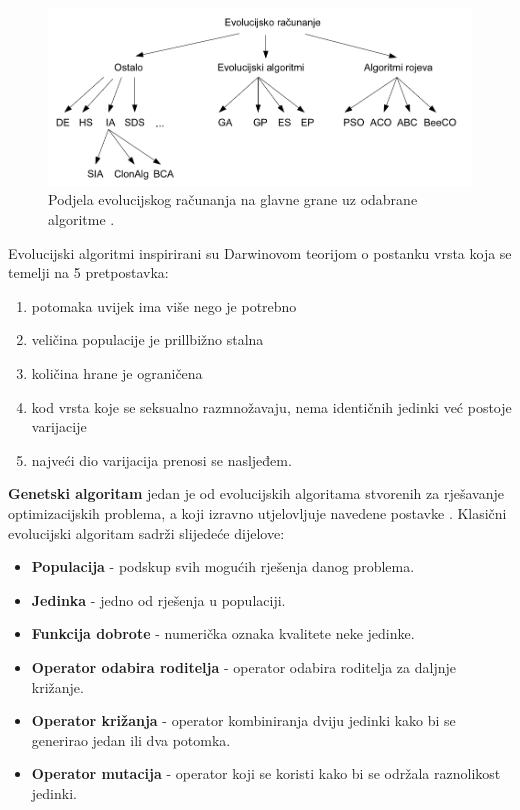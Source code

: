 \documentclass[times, utf8, zavrsni]{fer}
\begin{document}
\begin{figure}[htb]
\centering
\includegraphics[width=15cm]{images/evolucijske_grane.png}
\caption{Podjela evolucijskog računanja na glavne grane uz odabrane algoritme \citep{cupic-disertacija}.}
\label{fig:evolucijske_grane}
\end{figure}

Evolucijski algoritmi inspirirani su Darwinovom teorijom o postanku vrsta koja se temelji na 5 pretpostavka:

\begin{enumerate}
	\item potomaka uvijek ima više nego je potrebno
	\item veličina populacije je prillbižno stalna
	\item količina hrane je ograničena
	\item kod vrsta koje se seksualno razmnožavaju, nema identičnih jedinki već postoje varijacije
	\item najveći dio varijacija prenosi se nasljeđem.
\end{enumerate}

	\textbf{Genetski algoritam} jedan je od evolucijskih algoritama stvorenih za rješavanje optimizacijskih problema, a koji izravno utjelovljuje navedene postavke \citep{cupic-skripta}.  Klasični evolucijski algoritam sadrži slijedeće dijelove:
	
\begin{itemize}
	\item \textbf{Populacija} - podskup svih mogućih rješenja danog problema.
	\item \textbf{Jedinka} - jedno od rješenja u populaciji.
	\item \textbf{Funkcija dobrote} - numerička oznaka kvalitete neke jedinke.
	\item \textbf{Operator odabira roditelja} - operator odabira roditelja za daljnje križanje.
	\item \textbf{Operator križanja} - operator kombiniranja dviju jedinki kako bi se generirao jedan ili dva potomka.
	\item \textbf{Operator mutacija} - operator koji se koristi kako bi se održala raznolikost jedinki.
\end{itemize}
\end{document}
